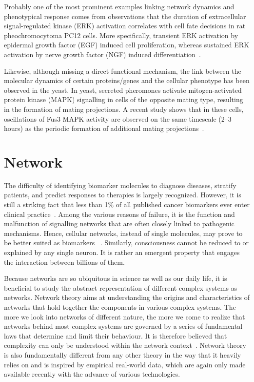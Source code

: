Probably one of the most prominent examples linking network
dynamics and phenotypical response comes from observations 
that the duration of extracellular signal-regulated kinase (ERK) activation correlates with cell fate decisions in rat pheochromocytoma PC12 cells. More specifically, transient ERK activation by epidermal growth factor (EGF) induced cell proliferation, whereas sustained ERK activation by nerve growth factor (NGF) induced differentiation~\citep{Marshall1995a,Santos2007}.

Likewise, although missing a direct functional mechanism, the link between the molecular 
dynamics of certain proteins/genes and the cellular phenotype has been observed in the yeast.
In yeast, secreted pheromones activate mitogen-activated 
protein kinase (MAPK) signalling in cells of the opposite mating type, resulting in the formation of mating projections. A recent study shows that in these cells, oscillations of Fus3 MAPK activity are observed on the same timescale (2--3 hours) as the periodic formation of additional mating projections~\citep{Hilioti2008}. 

\section{Network}
The difficulty of identifying biomarker molecules to diagnose diseases, stratify patients, and predict responses to therapies is
largely recognized. However, it is still a striking fact
that less than 1\% of all published cancer biomarkers ever 
enter clinical practice~\citep{Kern2012}. Among the various
reasons of failure, it is the function and malfunction of signalling networks that are often closely linked to pathogenic mechanisms. Hence, cellular networks, instead of single
molecules, may prove to be better suited as biomarkers~%
\citep{Barabasi2011,Chuang2007,Chu2008}.
Similarly, consciousness cannot be reduced to or explained by any single 
neuron. It is rather an emergent property that engages 
the interaction between billions of them. 

Because networks are so ubiquitous
in science as well as our daily life, it is beneficial to
study the abstract representation of different complex 
systems as networks. Network theory aims at understanding the origins and characteristics of networks that hold together the components in various complex systems. The more we look
into networks of different nature, the more we come to 
realize that networks behind most complex systems are governed by a series of fundamental laws that determine and limit their behaviour. 
It is therefore believed that complexity can only be understood within the
network context~\citep{Barabasi2012}. 
Network theory is also fundamentally different
from any other theory in the way that 
it heavily relies on and is inspired by
empirical real-world data, which are again only made 
available recently with the advance of various technologies.
 
